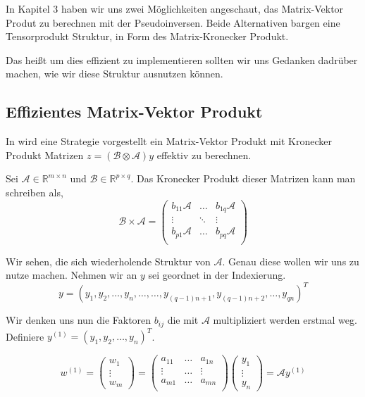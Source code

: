 In Kapitel 3 haben wir uns zwei Möglichkeiten angeschaut, das Matrix-Vektor Produt zu berechnen mit der Pseudoinversen. Beide Alternativen bargen eine Tensorprodukt Struktur, in Form des Matrix-Kronecker Produkt.

Das heißt um dies effizient zu implementieren sollten wir uns Gedanken dadrüber machen, wie wir diese Struktur ausnutzen können.

\subsection{ Effizientes Matrix-Vektor Produkt }
In \cite{Teachlet} wird eine Strategie vorgestellt ein Matrix-Vektor Produkt mit Kronecker Produkt Matrizen $z=(\mathcal{B} \otimes \mathcal{A})y$ effektiv zu berechnen.

Sei $\mathcal{A} \in \mathbb{R}^{m \times n}$ und $\mathcal{B} \in \mathbb{R}^{p \times q}$. Das Kronecker Produkt dieser Matrizen kann man schreiben als, 
\begin{equation*}
\mathcal{B} \times \mathcal{A} =
\begin{pmatrix}
b_{11}\mathcal{A} & \dots  & b_{1q}\mathcal{A} \\
\vdots & \ddots & \vdots \\
b_{p1}\mathcal{A} & \dots & b_{pq}\mathcal{A} \\
\end{pmatrix}
\end{equation*}

Wir sehen, die sich wiederholende Struktur von $\mathcal{A}$. Genau diese wollen wir uns zu nutze machen. Nehmen wir an $y$ sei geordnet in der Indexierung.
\begin{equation*}
y = (y_1,y_2,\dots,y_n,\dots,\dots,y_{(q-1)n+1},y_{(q-1)n+2},\dots,y_{qn})^T
\end{equation*}

Wir denken uns nun die Faktoren $b_{ij}$ die mit $\mathcal{A}$ multipliziert werden erstmal weg. Definiere $y^{(1)}=(y_1,y_2,\dots,y_n)^T$.

\begin{equation*}
w^{(1)}=
\begin{pmatrix}
w_1 \\ \vdots \\ w_m 
\end{pmatrix}
=
\begin{pmatrix}
a_{11} & \dots & a_{1n} \\
\vdots & \dots & \vdots \\
a_{m1} & \dots & a_{mn} \\
\end{pmatrix}
\begin{pmatrix}
y_1 \\ \vdots \\ y_n
\end{pmatrix}
= \mathcal{A}y^{(1)}
\end{equation*}

